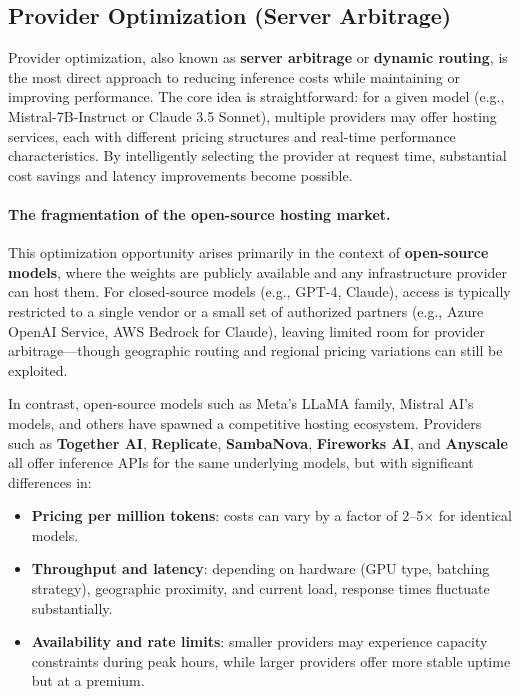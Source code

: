 \documentclass[english]{article}
\begin{document}
\subsection{Provider Optimization (Server Arbitrage)}

Provider optimization, also known as \textbf{server arbitrage} or \textbf{dynamic routing}, is the most direct approach to reducing inference costs while maintaining or improving performance. The core idea is straightforward: for a given model (e.g., Mistral-7B-Instruct or Claude 3.5 Sonnet), multiple providers may offer hosting services, each with different pricing structures and real-time performance characteristics. By intelligently selecting the provider at request time, substantial cost savings and latency improvements become possible.

\paragraph{The fragmentation of the open-source hosting market.}

This optimization opportunity arises primarily in the context of \textbf{open-source models}, where the weights are publicly available and any infrastructure provider can host them. For closed-source models (e.g., GPT-4, Claude), access is typically restricted to a single vendor or a small set of authorized partners (e.g., Azure OpenAI Service, AWS Bedrock for Claude), leaving limited room for provider arbitrage—though geographic routing and regional pricing variations can still be exploited.

In contrast, open-source models such as Meta's LLaMA family, Mistral AI's models, and others have spawned a competitive hosting ecosystem. Providers such as \textbf{Together AI}, \textbf{Replicate}, \textbf{SambaNova}, \textbf{Fireworks AI}, and \textbf{Anyscale} all offer inference APIs for the same underlying models, but with significant differences in:
\begin{itemize}
    \item \textbf{Pricing per million tokens}: costs can vary by a factor of 2--5× for identical models.
    \item \textbf{Throughput and latency}: depending on hardware (GPU type, batching strategy), geographic proximity, and current load, response times fluctuate substantially.
    \item \textbf{Availability and rate limits}: smaller providers may experience capacity constraints during peak hours, while larger providers offer more stable uptime but at a premium.
\end{itemize}
\end{document}
